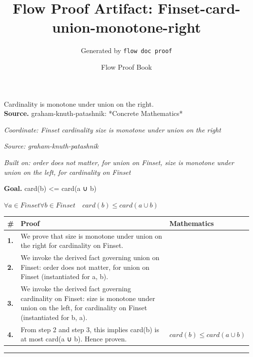 \documentclass[11pt]{article}
\title{Flow Proof Artifact: Finset-card-union-monotone-right}
\author{Generated by \texttt{flow doc proof}}
\date{Flow Proof Book}
\theoremstyle{definition}
\begin{document}
\maketitle
Cardinality is monotone under union on the right.\\[0.5em]
\textbf{Source.} graham-knuth-patashnik: *Concrete Mathematics*\\[0.5em]
\bigskip
{}\par
\smallskip\noindent\textit{Coordinate: Finset \cdot cardinality \cdot size is monotone under union on the right}\par
\smallskip\noindent\textit{Source: graham-knuth-patashnik}\par
\smallskip\noindent\textit{Built on: order does not matter, for union on Finset, size is monotone under union on the left, for cardinality on Finset}\par
\medskip
\noindent\textbf{Goal.} card(b) <= card(a ∪ b)\par
\noindent$\displaystyle \forall a \in Finset \forall b \in Finset\quad card(b) \le card(a ∪ b)$\par
\medskip
\noindent
\begin{tabular}{@{} >{\raggedright\arraybackslash}p{} >{\raggedright\arraybackslash}p{} >{\raggedleft\arraybackslash}p{} @{}}
\textbf{\#} & \textbf{Proof} & \textbf{Mathematics} \\
\midrule
\textbf{1.} & We prove that size is monotone under union on the right for cardinality on Finset. & \\[0.45em]
\textbf{2.} & We invoke the derived fact governing union on Finset: order does not matter, for union on Finset (instantiated for a, b). & \\[0.45em]
\textbf{3.} & We invoke the derived fact governing cardinality on Finset: size is monotone under union on the left, for cardinality on Finset (instantiated for b, a). & \\[0.45em]
\textbf{4.} & From step 2 and step 3, this implies card(b) is at most card(a ∪ b). Hence proven. & $\displaystyle card(b) \le card(a ∪ b)$ \\[0.45em]
\bottomrule
\end{tabular}
\label{thm:Finset-cardinality-size_is_monotone_under_union_on_the_right}
\par\medskip\hrule
\end{document}
